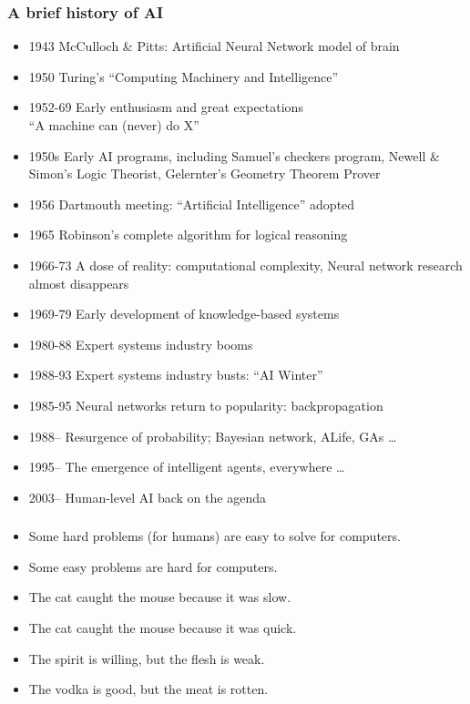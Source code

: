 \documentclass[UTF8,11pt,colorlinks,compress,openany]{beamer}%
\begin{document}
\begin{frame}\frametitle{A brief history of AI}
\begin{itemize}
	\item 1943 McCulloch \& Pitts: Artificial Neural Network model of brain
	\item 1950 Turing's ``Computing Machinery and Intelligence''
	\item 1952-69 Early enthusiasm and great expectations\\
	``A machine can (never) do X''
	\item 1950s Early AI programs, including Samuel's checkers program, Newell \& Simon's Logic Theorist, Gelernter's Geometry Theorem Prover
	\item 1956 Dartmouth meeting: ``Artificial Intelligence'' adopted
	\item 1965 Robinson's complete algorithm for logical reasoning
	\item 1966-73 A dose of reality: computational complexity, Neural network research almost disappears
	\item 1969-79 Early development of knowledge-based systems
	\item 1980-88 Expert systems industry booms
	\item 1988-93 Expert systems industry busts: ``AI Winter''
	\item 1985-95 Neural networks return to popularity: backpropagation
	\item 1988-- Resurgence of probability; Bayesian network, ALife, GAs \dots
	\item 1995-- The emergence of intelligent agents, everywhere \dots
	\item 2003-- Human-level AI back on the agenda
\end{itemize}
\end{frame}

\begin{frame}\frametitle{}
\begin{itemize}
	\item Some hard problems (for humans) are easy to solve for computers.
	\item Some easy problems are hard for computers.
	\item The cat caught the mouse because it was slow.
	\item The cat caught the mouse because it was quick.
	\item The spirit is willing, but the flesh is weak.
	\item The vodka is good, but the meat is rotten.
\end{itemize}
\end{frame}
\end{document}
